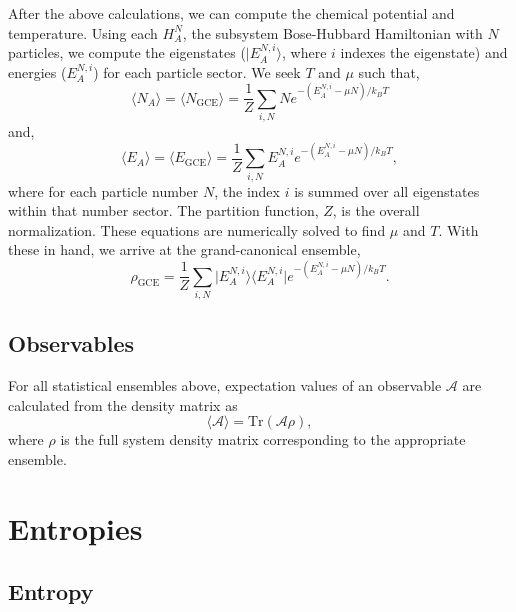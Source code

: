 After the above calculations, we can compute the chemical potential and temperature. Using each $H_A^N$, the subsystem Bose-Hubbard Hamiltonian with $N$ particles, we compute the eigenstates ($\vert E^{N,i}_A \rangle$, where $i$ indexes the eigenstate) and energies ($E^{N,i}_A$) for each particle sector. We seek $T$ and $\mu$ such that, 
\[
\langle N_A \rangle = \langle N_{\mathrm{GCE}} \rangle = \frac{1}{Z}\sum_{i,N} N e^{-(E^{N,i}_A-\mu N)/k_B T}
\]
and, 
\[
\langle E_A \rangle = \langle E_{\mathrm{GCE}} \rangle = \frac{1}{Z} \sum_{i,N} E^{N,i}_A e^{-(E^{N,i}_A-\mu N)/k_B T},
\]
where for each particle number $N$, the index $i$ is summed over all eigenstates within that number sector. The partition function, $Z$, is the overall normalization. These equations are numerically solved to find $\mu$ and $T$. With these in hand, we arrive at the grand-canonical ensemble, 
\[
\rho_{\mathrm{GCE}} = \frac{1}{Z}\sum_{i,N} \vert E^{N,i}_A \rangle \langle E^{N,i}_A \vert e^{-(E^{N,i}_A-\mu N)/k_B T}.
\]


\subsection{Observables}

For all statistical ensembles above, expectation values of an observable $\mathcal A$ are calculated from the density matrix as 
\[
\langle \mathcal A \rangle = \mathrm{Tr} (\mathcal A \rho),
\]
where $\rho$ is the full system density matrix corresponding to the appropriate ensemble.
\section{Entropies}

\subsection{\Renyi Entropy}

